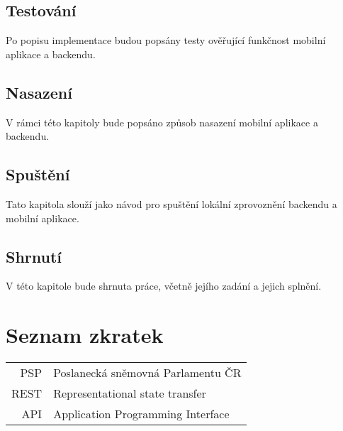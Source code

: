 \documentclass[czech,master,unicode]{ctufit-thesis}
\theoremstyle{plain}
\theoremstyle{definition}
\theoremstyle{remark}
\numberwithin{theorem}{chapter}
\begin{document}
\begin{summarypage}
\section*{Testování}
Po popisu implementace budou popsány testy ověřující funkčnost mobilní aplikace a backendu.

\section*{Nasazení}
V rámci této kapitoly bude popsáno způsob nasazení mobilní aplikace a backendu.

\section*{Spuštění}
Tato kapitola slouží jako návod pro spuštění lokální zprovoznění backendu a mobilní aplikace.

\section*{Shrnutí}
V této kapitole bude shrnuta práce, včetně jejího zadání a jejich splnění.

\end{summarypage}

\chapter{Seznam zkratek}
	
\begin{tabular}{rl}
PSP & Poslanecká sněmovná Parlamentu ČR\\
REST & Representational state transfer\\
API & Application Programming Interface
\end{tabular}

\mainmatter\mainmatterinit %



\appendix\appendixinit %


\backmatter %

\printbibliography %

\end{document}
